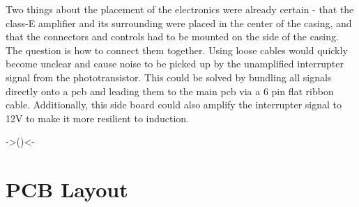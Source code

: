 Two things about the placement of the electronics were already certain - that the class-E amplifier and its surrounding were placed in the center of the casing, and that the connectors and controls had to be mounted on the side of the casing. The question is how to connect them together. Using loose cables would quickly become unclear and cause noise to be picked up by the unamplified interrupter signal from the phototransistor. This could be solved by bundling all signals directly onto a \gls{pcb} and leading them to the main \gls{pcb} via a 6 pin flat ribbon cable. Additionally, this side board could also amplify the interrupter signal to 12V to make it more resilient to induction. 


->()<-%

\section{PCB Layout}

